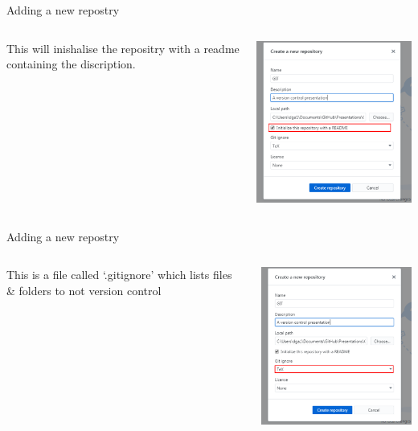 \documentclass[10pt]{beamer}
\begin{document}
\begin{frame}[fragile]{Adding a new repostry}
  \begin{columns}[T]
    \begin{column}{.2\textwidth}
	\small This will inishalise the repositry with a readme containing the discription.
    \end{column}
    \begin{column}{.8\textwidth}
	\includegraphics[width=8cm]{Figs/GHD/new_repo_04}
    \end{column}
  \end{columns}
\end{frame}

\begin{frame}[fragile]{Adding a new repostry}
  \begin{columns}[T]
    \begin{column}{.2\textwidth}
	\small This is a file called `.gitignore' which lists files \& folders to not version control
    \end{column}
    \begin{column}{.8\textwidth}
	\includegraphics[width=8cm]{Figs/GHD/new_repo_05}
    \end{column}
  \end{columns}
\end{frame}
\end{document}
